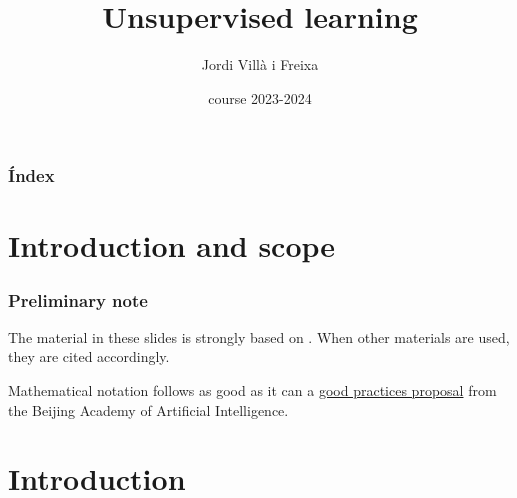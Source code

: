 \documentclass{beamer}
\title[Monte Carlo Methods]{Unsupervised learning} %
\author{Jordi Villà i Freixa} %
\institute[FCTE] %
{
Universitat de Vic - Universitat Central de Catalunya \\
Study Abroad\\ %
\medskip
\textit{jordi.villa@uvic.cat} %
}
\date{course 2023-2024}
\begin{document}
\begin{frame}
\titlepage %
\end{frame}

\begin{frame}
\frametitle{Índex} %
\tableofcontents %
\end{frame}

\section{Introduction and scope}
\begin{frame}
  \frametitle{Preliminary note}
  The material in these slides is strongly based on \cite{kroese2020}. When other materials are used, they are cited accordingly.

  Mathematical notation follows as good as it can a \href{https://ctan.math.utah.edu/ctan/tex-archive/macros/latex/contrib/mlmath/mlmath.pdf}{good practices proposal} from the Beijing Academy of Artificial Intelligence.
  \end{frame}

\section{Introduction} %

\end{document}
